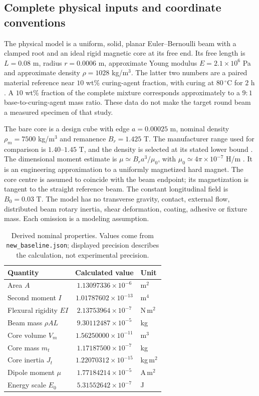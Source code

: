 \subsection{Complete physical inputs and coordinate conventions}
\label{sx:physical-inputs}
The physical model is a uniform, solid, planar Euler--Bernoulli beam
with a clamped root and an ideal rigid magnetic core at its free end.
Its free length is $L=0.08$ m, radius $r=0.0006$ m, approximate
Young modulus $E=2.1\times10^6$ Pa and approximate density
$\rho=1028$ kg/m$^3$. The latter two numbers are a paired material
reference near $10$ wt\% curing-agent fraction, with curing at
$80\,^{\circ}$C for $2$ h \citep{cho2021pdms}. A $10$ wt\% fraction
of the complete mixture corresponds approximately to a $9{:}1$
base-to-curing-agent mass ratio. These data do not make the target
round beam a measured specimen of that study.

The bare core is a design cube with edge $a=0.00025$ m, nominal
density $\rho_m=7500$ kg/m$^3$ and remanence $B_r=1.425$ T.
The manufacturer range used for comparison is $1.40$--$1.45$ T,
and the density is selected at its stated lower bound
\citep{smN50}. The dimensional moment estimate is
$\mu\simeq B_ra^3/\mu_0$, with
$\mu_0\simeq4\pi\times10^{-7}$ H/m \citep{kjMoment}.
It is an engineering approximation to a uniformly magnetized hard
magnet. The core centre is assumed to coincide with the beam endpoint;
its magnetization is tangent to the straight reference beam.
The constant longitudinal field is $B_0=0.03$ T.
The model has no transverse gravity, contact, external flow,
distributed beam rotary inertia, shear deformation, coating, adhesive
or fixture mass. Each omission is a modeling assumption.

\begin{table}[t]
\centering
\caption{Derived nominal properties. Values come from
\texttt{new\_baseline.json}; displayed precision describes the
calculation, not experimental precision.}
\label{sx:properties}
\setlength{\tabcolsep}{3pt}
\begin{tabular}{lcl}
\toprule
Quantity & Calculated value & Unit\\
\midrule
Area $A$ & $1.13097336\times10^{-6}$ & m$^2$ \\
Second moment $I$ & $1.01787602\times10^{-13}$ & m$^4$ \\
Flexural rigidity $EI$ & $2.13753964\times10^{-7}$ & N\,m$^2$ \\
Beam mass $\rho AL$ & $9.30112487\times10^{-5}$ & kg \\
Core volume $V_m$ & $1.56250000\times10^{-11}$ & m$^3$ \\
Core mass $m_t$ & $1.17187500\times10^{-7}$ & kg \\
Core inertia $J_t$ & $1.22070312\times10^{-15}$ & kg\,m$^2$ \\
Dipole moment $\mu$ & $1.77184214\times10^{-5}$ & A\,m$^2$ \\
Energy scale $E_0$ & $5.31552642\times10^{-7}$ & J \\
\bottomrule
\end{tabular}
\end{table}

